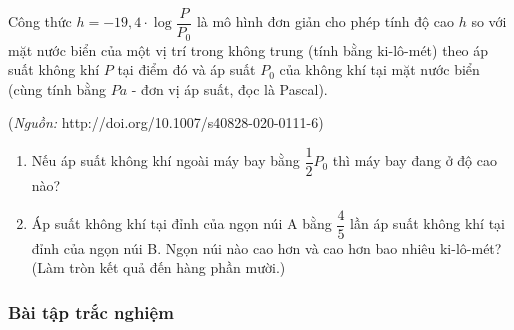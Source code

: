 \begin{bt}
	Công thức $h=-19{,}4\cdot\log\dfrac{P}{P_0}$ là mô hình đơn giản cho phép tính độ cao $h$ so với mặt nước biển của một vị trí trong không trung (tính bằng ki-lô-mét) theo áp suất không khí $P$ tại điểm đó và áp suất $P_0$ của không khí tại mặt nước biển (cùng tính bằng $Pa$ - đơn vị áp suất, đọc là Pascal).
	\begin{center}
		(\textit{Nguồn:}  http://doi.org/10.1007/s40828-020-0111-6)
	\end{center}
	\begin{enumerate}
		\item Nếu áp suất không khí ngoài máy bay bằng $\dfrac{1}{2}P_0$ thì máy bay đang ở độ cao nào?
		\item Áp suất không khí tại đỉnh của ngọn núi A bằng $\dfrac{4}{5}$ lần áp suất không khí tại đỉnh của ngọn núi B. Ngọn núi nào cao hơn và cao hơn bao nhiêu ki-lô-mét? (Làm tròn kết quả đến hàng phần mười.)
	\end{enumerate}
\end{bt}

\subsubsection{Bài tập trắc nghiệm}


